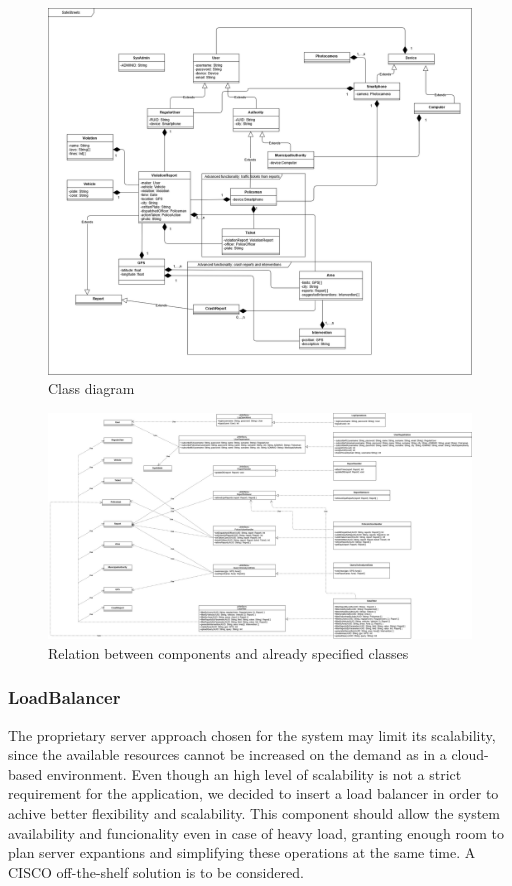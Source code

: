 \begin{figure}[H]
	\centering
	\includegraphics[width=\textwidth]{Images/ADV_class_diagram}
	\caption{Class diagram}
\end{figure}
\newpage

\begin{figure}[H]
	\centering
	\includegraphics[angle=90, scale=0.25]{Images/component_class_relation}
	\caption{Relation between components and already specified classes}
\end{figure}
\newpage

\subsubsection{LoadBalancer}
The proprietary server approach chosen for the system may limit its scalability, since the available resources cannot be increased on the demand as in a cloud-based environment. Even though an high level of scalability is not a strict requirement for the application, we decided to insert a load balancer in order to achive better flexibility and scalability. This component should allow the system availability and funcionality even in case of heavy load, granting enough room to plan server expantions and simplifying these operations at the same time. \newline
A CISCO off-the-shelf solution is to be considered.

